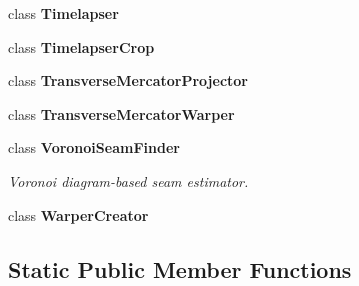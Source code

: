\begin{DoxyCompactItemize}
class {\bfseries Timelapser}
\item 
class {\bfseries Timelapser\+Crop}
\item 
class {\bfseries Transverse\+Mercator\+Projector}
\item 
class {\bfseries Transverse\+Mercator\+Warper}
\item 
class {\bfseries Voronoi\+Seam\+Finder}
\begin{DoxyCompactList}\small\item\em Voronoi diagram-\/based seam estimator. \end{DoxyCompactList}\item 
class {\bfseries Warper\+Creator}
\end{DoxyCompactItemize}
\subsection*{Static Public Member Functions}
